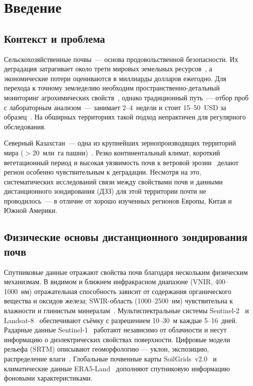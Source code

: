 \section{Введение}
\label{sec:introduction}

\subsection{Контекст и проблема}

Сельскохозяйственные почвы~--- основа продовольственной безопасности. Их деградация затрагивает около трети мировых земельных ресурсов~\citep{Montanarella2016}, а экономические потери оцениваются в миллиарды долларов ежегодно. Для перехода к точному земледелию необходим пространственно-детальный мониторинг агрохимических свойств~\citep{Gebbers2010}, однако традиционный путь~--- отбор проб с лабораторным анализом~--- занимает 2--4~недели и стоит 15--50~USD за образец~\citep{ViscarraRossel2006}. На обширных территориях такой подход непрактичен для регулярного обследования.

Северный Казахстан~--- одна из крупнейших зернопроизводящих территорий мира ($>$20~млн~га пашни)~\citep{Swinnen2017}. Резко континентальный климат, короткий вегетационный период и высокая уязвимость почв к ветровой эрозии~\citep{Kraemer2015} делают регион особенно чувствительным к деградации. Несмотря на это, систематических исследований связи между свойствами почв и данными дистанционного зондирования (ДЗЗ) для этой территории почти не проводилось~--- в отличие от хорошо изученных регионов Европы, Китая и Южной Америки.

\subsection{Физические основы дистанционного зондирования почв}

Спутниковые данные отражают свойства почв благодаря нескольким физическим механизмам. В видимом и ближнем инфракрасном диапазоне (VNIR, 400--1000~нм) отражательная способность зависит от содержания органического вещества и оксидов железа; SWIR-область (1000--2500~нм) чувствительна к влажности и глинистым минералам~\citep{BenDor2009, ViscarraRossel2010}. Мультиспектральные системы Sentinel-2~\citep{Drusch2012} и Landsat-8~\citep{Roy2014} обеспечивают съёмку с разрешением 10--30~м каждые 5--16~дней. Радарные данные Sentinel-1~\citep{Torres2012} работают независимо от облачности и несут информацию о диэлектрических свойствах поверхности. Цифровые модели рельефа (SRTM) описывают геоморфологию --- уклон, экспозицию, распределение влаги~\citep{Farr2007}. Глобальные почвенные карты SoilGrids~v2.0~\citep{Hengl2017} и климатические данные ERA5-Land~\citep{MunozSabater2021} дополняют спутниковую информацию фоновыми характеристиками.

